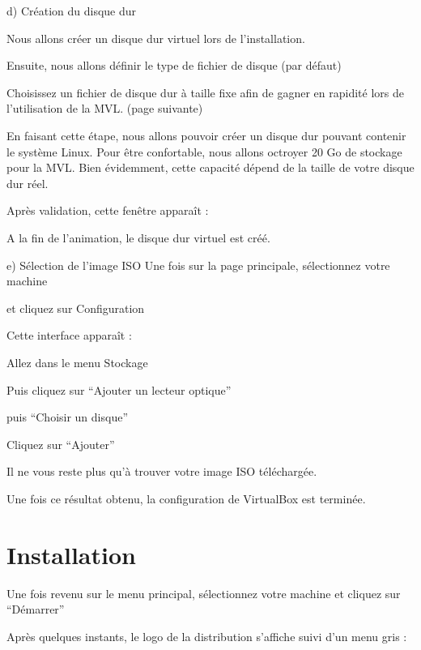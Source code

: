 {    d) Création du disque dur

Nous allons créer un disque dur virtuel lors de l’installation.

Ensuite, nous allons définir le type de fichier de disque (par défaut)



Choisissez un fichier de disque dur à taille fixe afin de gagner en rapidité lors de l’utilisation de la MVL. (page suivante)





En faisant cette étape, nous allons pouvoir créer un disque dur pouvant contenir le système Linux. Pour être confortable, nous allons octroyer 20 Go de stockage pour la MVL.
Bien évidemment, cette capacité dépend de la taille de votre disque dur réel.

Après validation, cette fenêtre apparaît :


A la fin de l’animation, le disque dur virtuel est créé.





    e) Sélection de l’image ISO
Une fois sur la page principale, sélectionnez votre machine 

et cliquez sur Configuration


Cette interface apparaît :


Allez dans le menu Stockage


Puis cliquez sur “Ajouter un lecteur optique”


puis “Choisir un disque”

Cliquez sur “Ajouter”


Il ne vous reste plus qu'à trouver votre image ISO téléchargée.








Une fois ce résultat obtenu, la configuration de VirtualBox est terminée.



\section{Installation}


Une fois revenu sur le menu principal, sélectionnez votre machine et cliquez sur “Démarrer”


Après quelques instants, le logo de la distribution s’affiche suivi d’un menu gris :




}
